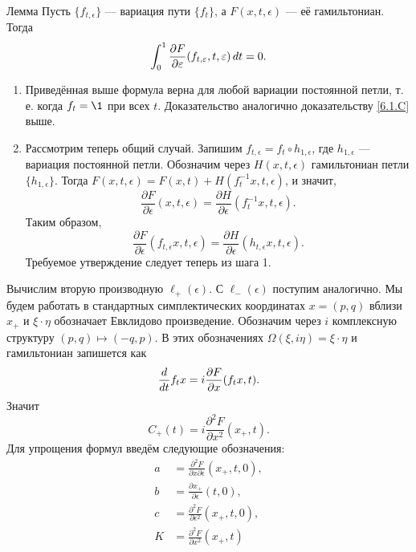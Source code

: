 \begin{thm}{Лемма}\label{12.4.B}
Пусть $\{f_{t,\epsilon}\}$ — вариация пути $\{f_t\}$, а $F(x, t,\epsilon)$ — её гамильтониан.
Тогда 
\[\int_0^1\frac{\partial F}{\partial \varepsilon}(f_{t,\varepsilon},t,\varepsilon)\,d t=0.\] 

\end{thm}

\begin{enumerate}[1)]
\item Приведённая выше формула верна для любой вариации постоянной петли, т. е. когда $f_t = \1$ при всех $t$.
Доказательство аналогично доказательству \ref{6.1.C} выше.
\item Рассмотрим теперь общий случай.
Запишим $f_{t,\epsilon} = f_t \circ h_{1,\epsilon}$, где $h_{1,\epsilon}$ — вариация постоянной петли.
Обозначим через $H(x, t, \epsilon)$ гамильтониан петли $\{h_{1,\epsilon}\}$.
Тогда $F(x,t,\epsilon) = F(x,t) + H(f_t^{-1}x,t,\epsilon)$, и значит, 
\[\frac{\partial F}{\partial \epsilon}(x,t,\epsilon)=\frac{\partial H}{\partial \epsilon}(f_t^{-1}x,t,\epsilon).\]
Таким образом,
\[\frac{\partial F}{\partial \epsilon}(f_{t,\epsilon}x,t,\epsilon)=\frac{\partial H}{\partial \epsilon}(h_{t,\epsilon}x,t,\epsilon).\]
Требуемое утверждение следует теперь из шага 1.
\end{enumerate}
\qeds

Вычислим вторую производную $\ell_+(\epsilon)$.
С $\ell_-(\epsilon)$ поступим аналогично.
Мы будем работать в стандартных симплектических координатах $x = (p, q)$ вблизи $x_+$ и $\xi\cdot\eta$ обозначает Евклидово  произведение.
Обозначим через $i$ комплексную структуру $(p, q) \mapsto (-q, p)$.
В этих обозначениях $\Omega(\xi, i\eta) = \xi\cdot\eta$ и гамильтониан запишется как
\[\frac{d}{d t}f_tx=i\frac{\partial F}{\partial x}(f_tx,t).\]
Значит
\[C_+(t)=i\frac{\partial^2F}{\partial x^2}(x_+,t).\]
Для упрощения формул введём следующие обозначения: 
\begin{align*}
a&=\frac{\partial^2 F}{\partial x\partial\epsilon}(x_+,t,0),
\\
b&=\frac{\partial x_+}{\partial\epsilon}(t,0),
\\
c&=\frac{\partial^2 F}{\partial\epsilon^2}(x_+,t,0),
\\
K&=\frac{\partial^2 F}{\partial x^2}(x_+,t)
\end{align*}

